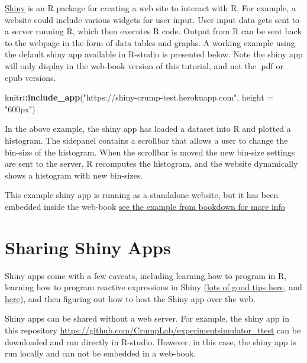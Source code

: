 \documentclass[]{book}
\newenvironment{Shaded}{\begin{snugshade}}{\end{snugshade}}
\newcommand{\KeywordTok}[1]{\textcolor[rgb]{0.13,0.29,0.53}{\textbf{#1}}}
\newcommand{\DataTypeTok}[1]{\textcolor[rgb]{0.13,0.29,0.53}{#1}}
\newcommand{\StringTok}[1]{\textcolor[rgb]{0.31,0.60,0.02}{#1}}
\newcommand{\OperatorTok}[1]{\textcolor[rgb]{0.81,0.36,0.00}{\textbf{#1}}}
\newcommand{\NormalTok}[1]{#1}
\begin{document}
\href{https://shiny.rstudio.com}{Shiny} is an R package for creating a
web site to interact with R. For example, a website could include
various widgets for user input. User input data gets sent to a server
running R, which then executes R code. Output from R can be sent back to
the webpage in the form of data tables and graphs. A working example
using the default shiny app available in R-studio is presented below.
Note the shiny app will only display in the web-book version of this
tutorial, and not the .pdf or epub versions.

\begin{Shaded}
\begin{Highlighting}[]
\NormalTok{knitr}\OperatorTok{::}\KeywordTok{include_app}\NormalTok{(}\StringTok{"https://shiny-crump-test.herokuapp.com"}\NormalTok{, }
  \DataTypeTok{height =} \StringTok{"600px"}\NormalTok{)}
\end{Highlighting}
\end{Shaded}

In the above example, the shiny app has loaded a dataset into R and
plotted a histogram. The sidepanel contains a scrollbar that allows a
user to change the bin-size of the histogram. When the scrollbar is
moved the new bin-size settings are sent to the server, R recomputes the
histogram, and the website dynamically shows a histogram with new
bin-sizes.

This example shiny app is running as a standalone website, but it has
been embedded inside the web-book
\href{https://bookdown.org/yihui/bookdown/web-pages-and-shiny-apps.html}{see
the example from bookdown for more info}

\section{Sharing Shiny Apps}\label{sharing-shiny-apps}

Shiny apps come with a few caveats, including learning how to program in
R, learning how to program reactive expressions in Shiny
(\href{https://shiny.rstudio.com/tutorial/}{lots of good tips here}, and
\href{https://shiny.rstudio.com/articles/}{here}), and then figuring out
how to host the Shiny app over the web.

Shiny apps can be shared without a web server. For example, the shiny
app in this repository
\url{https://github.com/CrumpLab/experimentsimulator_ttest} can be
downloaded and run directly in R-studio. However, in this case, the
shiny app is run locally and can not be embedded in a web-book.
\end{document}
